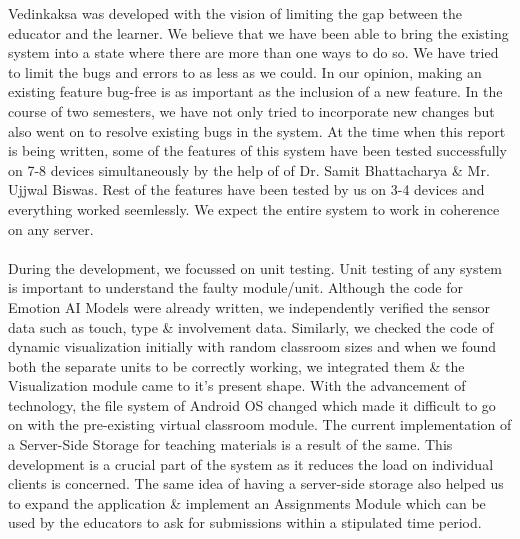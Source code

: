 \documentclass[10pt]{report}
\begin{document}
Vedinkaksa was developed with the vision of limiting the gap between the educator and the learner. We believe that we have been able to bring the existing system into a state where there are more than one ways to do so. We have tried to limit the bugs and errors to as less as we could. In our opinion, making an existing feature bug-free is as important as the inclusion of a new feature. In the course of two semesters, we have not only tried to incorporate new changes but also went on to resolve existing bugs in the system. At the time when this report is being written, some of the features of this system have been tested successfully on 7-8 devices simultaneously by the help of of Dr. Samit Bhattacharya \& Mr. Ujjwal Biswas. Rest of the features have been tested by us on 3-4 devices and everything worked seemlessly. We expect the entire system to work in coherence on any server. \\ \\
During the development, we focussed on unit testing. Unit testing of any system is important to understand the faulty module/unit. Although the code for Emotion AI Models were already written, we independently verified the sensor data such as touch, type \& involvement data. Similarly, we checked the code of dynamic visualization initially with random classroom sizes and when we found both the separate units to be correctly working, we integrated them \& the Visualization module came to it's present shape. \newpage
With the advancement of technology, the file system of Android OS changed which made it difficult to go on with the pre-existing virtual classroom module. The current implementation of a Server-Side Storage for teaching materials is a result of the same. This development is a crucial part of the system as it reduces the load on individual clients is concerned. The same idea of having a server-side storage also helped us to expand the application \& implement an Assignments Module which can be used by the educators to ask for submissions within a stipulated time period.
\end{document}
